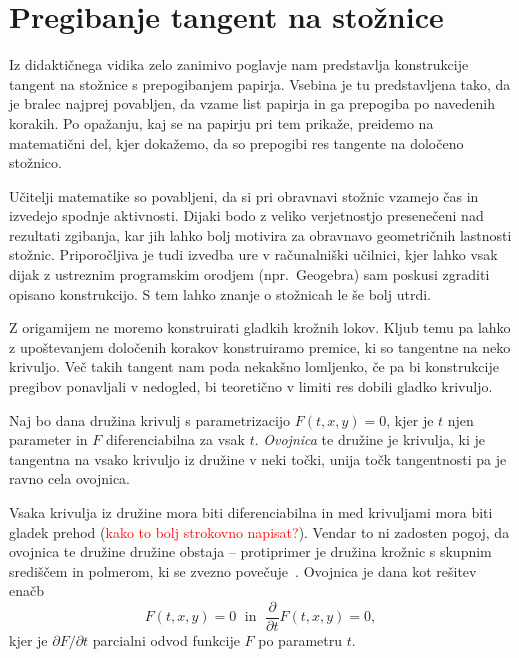 \section{Pregibanje tangent na stožnice}
\label{pogl:stoznice}

Iz didaktičnega vidika zelo zanimivo poglavje nam predstavlja konstrukcije tangent na stožnice s prepogibanjem papirja. Vsebina je tu predstavljena tako, da je bralec najprej povabljen, da vzame list papirja in ga prepogiba po navedenih korakih. Po opažanju, kaj se na papirju pri tem prikaže, preidemo na matematični del, kjer dokažemo, da so prepogibi res tangente na določeno stožnico.

Učitelji matematike so povabljeni, da si pri obravnavi stožnic vzamejo čas in izvedejo spodnje aktivnosti. Dijaki bodo z veliko verjetnostjo presenečeni nad rezultati zgibanja, kar jih lahko bolj motivira za obravnavo geometričnih lastnosti stožnic. Priporočljiva je tudi izvedba ure v računalniški učilnici, kjer lahko vsak dijak z ustreznim programskim orodjem (npr.\ Geogebra) sam poskusi zgraditi opisano konstrukcijo. S tem lahko znanje o stožnicah le še bolj utrdi.

Z origamijem ne moremo konstruirati gladkih krožnih lokov. Kljub temu pa lahko z upoštevanjem določenih korakov konstruiramo premice, ki so tangentne na neko krivuljo. Več takih tangent nam poda nekakšno lomljenko, če pa bi konstrukcije pregibov ponavljali v nedogled, bi teoretično v limiti res dobili gladko krivuljo.

\begin{definicija}
    \label{def:ovojnica}
    Naj bo dana družina krivulj s parametrizacijo $F(t, x, y) = 0$, kjer je $t$ njen parameter in $F$ diferenciabilna za vsak $t$. \emph{Ovojnica} te družine je krivulja, ki je tangentna na vsako krivuljo iz družine v neki točki, unija točk tangentnosti pa je ravno cela ovojnica.
\end{definicija}

\begin{opomba}
    Vsaka krivulja iz družine mora biti diferenciabilna in med krivuljami mora biti gladek prehod (\textcolor{red}{kako to bolj strokovno napisat?}). Vendar to ni zadosten pogoj, da ovojnica te družine družine obstaja -- protiprimer je družina krožnic s skupnim središčem in polmerom, ki se zvezno povečuje~\cite{wikienvelope}. Ovojnica je dana kot rešitev enačb
    $$ F(t, x, y) = 0 \; \text{ in } \; \frac{\partial}{\partial t} F(t, x, y) = 0, $$
    kjer je $\partial F / \partial t$ parcialni odvod funkcije $F$ po parametru $t$.
\end{opomba}


